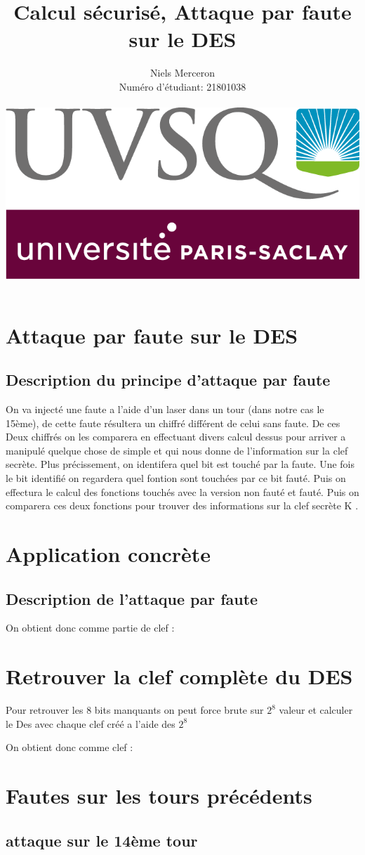 \documentclass[a4paper]{report}
\date{}
\title{Calcul sécurisé, Attaque par faute sur le DES}
\author{Niels Merceron \\ Numéro d'étudiant: 21801038 \\ \\ \includegraphics[scale=0.20]{logo-UVSQ-2020-RVB.png}}
\begin{document}
	\maketitle
	
	\newpage
	 \tableofcontents
		\chapter{Attaque par faute sur le DES}
			\section{Description du principe d'attaque par faute}
			On va injecté une faute a l'aide d'un laser dans un tour (dans notre cas le 15ème), de cette faute résultera un chiffré différent de celui sans faute.
			De ces Deux chiffrés on les comparera en effectuant divers calcul dessus pour arriver a manipulé quelque chose de simple et qui nous donne de l'information sur la clef secrète.
			Plus précissement, on identifera quel bit est touché par la faute. Une fois le bit identifié on regardera quel fontion sont touchées par ce bit fauté.
			Puis on effectura le calcul des fonctions touchés avec la version non fauté et fauté. Puis on comparera ces deux fonctions pour trouver des informations sur la clef secrète K .
			
			
		\chapter{Application concrète}
			\section{Description de l'attaque par faute}
			
			On obtient donc comme partie de clef :
		
		\chapter{Retrouver la clef complète du DES}
			Pour retrouver les 8 bits manquants on peut force brute sur $2^{8}$ valeur et calculer le Des avec chaque clef créé a l'aide des $2^{8}$
			
			On obtient donc comme clef : 
		
		\chapter{Fautes sur les tours précédents}
			\section{attaque sur le 14ème tour}
\end{document}
